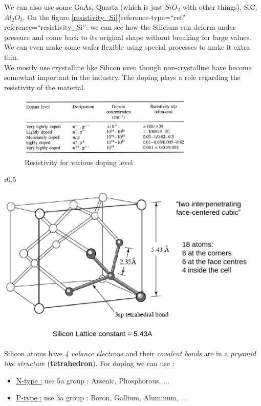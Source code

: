 \documentclass[
]{article}
\begin{document}
We can also use some GaAs, Quartz (which is just \(SiO_2\) with other
things), SiC, \(Al_2O_3\). On the figure
\protect\hyperlink{resistivity_Si}{{[}resistivity\_Si{]}}\{reference-type=``ref''
reference=``resistivity\_Si'': we can see how the Silicium can deform
under pressure and come back to its original shape without breaking for
large values. We can even make some wafer flexible using special
processes to make it extra thin.\\
We mostly use crystalline like Silicon even though non-crystalline have
become somewhat important in the industry. The doping plays a role
regarding the resistivity of the material.

\begin{figure}
\hypertarget{fig:resistivity-Si-Ohms}{%
\centering
\includegraphics[width=0.75\textwidth,height=\textheight]{resistivity_Ohm_Si.png}
\caption{Resistivity for various doping
level}\label{fig:resistivity-Si-Ohms}
}
\end{figure}

r0.5
\includegraphics[width=0.95\textwidth,height=\textheight]{crystal_si.png}

Silicon atoms have \emph{4 valance electrons} and their \emph{covalent
bonds} are in a \emph{pryamid like structure} (\textbf{tetrahedron}).
For doping we can use :

\begin{itemize}
\item
  \ul{N-type :} use 5a group : Arsenic, Phosphorous, ...
\item
  \ul{P-type :} use 3a group : Boron, Gallium, Aluminum, ...
\end{itemize}
\end{document}
